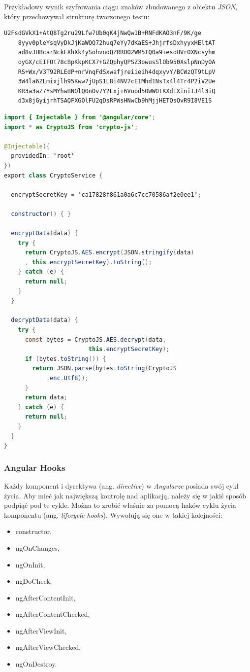 \documentclass[twoside]{projektInzynierskiMS}
\numberwithin{figure}{section}
\begin{document}
Przykładowy wynik szyfrowania ciągu znaków zbudowanego z obiektu \textit{JSON}, który przechowywał strukturę tworzonego testu:
\begin{lstlisting}[caption=Zaszyfrowany obiekt JSON przechowujący strukturę tworzonego testu. Źródło: Opracowanie własne., captionpos=b]
    U2FsdGVkX1+AtQ8Tg2ru29Lfw7Ub0qK4jNwQw1B+RNFdKAO3nF/9K/ge
    8yyv0pleYsqVyDkJjKaWQQ72huq7eYy7dKaES+JhjrfsDxhyyxHEltAT
    ad8vJHBcarNckEXhXk4ySohvnoQZRRDO2WM5TQ0a9+esoHVrOXNcsyhm
    oyGX/cEIFOt78cBpKkpKCX7+GZQphyQPSZ3owusSlOb950XslpNnDyOA
    RS+Wx/V3T92RLEdP+nrVnqFdSxwafjreiieih4dqxyvY/BCWzQT9tLpV
    3W4la6ZLmixjlh95Kww7jUpS1L8i4NV7cE1Mhd1NsTx4l4Tr4P2iV2Ue
    KR3a3aZ7YsMYhwBNOlQ0nOv7Y2Lxj+6Vood5OWWOtKXdLXiniIJ4l3iQ
    d3x8jGyijrhTSAQFXGOlFU2qDsRPWsHNwCb9hMjjHETQsQvR9I8VE1S
\end{lstlisting}

\begin{lstlisting}[language=Java,caption=Implementacja szyfrowania i deszyfrowania poprzez AES wykorzystując wygenerowany sekretny klucz. Źródło: Opracowanie własne., captionpos=b]
import { Injectable } from '@angular/core';
import * as CryptoJS from 'crypto-js';

@Injectable({
  providedIn: 'root'
})
export class CryptoService {

  encryptSecretKey = 'ca17828f861a0a6c7cc70586af2e0ee1';

  constructor() { }

  encryptData(data) {
    try {
      return CryptoJS.AES.encrypt(JSON.stringify(data)
      , this.encryptSecretKey).toString();
    } catch (e) {
      return null;
    }
  }

  decryptData(data) {
    try {
      const bytes = CryptoJS.AES.decrypt(data, 
                        this.encryptSecretKey);
      if (bytes.toString()) {
        return JSON.parse(bytes.toString(CryptoJS
            .enc.Utf8));
      }
      return data;
    } catch (e) {
      return null;
    }
  }
}
\end{lstlisting}

\subsubsection{Angular Hooks}
Każdy komponent i dyrektywa (ang. \textit{directive}) w \textit{Angularze} posiada swój cykl życia. Aby mieć jak największą kontrolę nad aplikacją, należy się w jakiś sposób podpiąć pod te cykle. Można to zrobić właśnie za pomocą haków cyklu życia komponentu (ang. \textit{lifecycle hooks}). Wywołują się one w takiej kolejności:
\begin{itemize}
    \item constructor,
    \item ngOnChanges,
    \item ngOnInit,
    \item ngDoCheck,
    \item ngAfterContentInit,
    \item ngAfterContentChecked,
    \item ngAfterViewInit,
    \item ngAfterViewChecked,
    \item ngOnDestroy.
\end{itemize}
\end{document}
